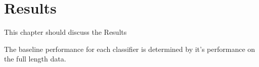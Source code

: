 \chapter{Results}
\label{ChapterResults}
This chapter should discuss the Results

The baseline performance for each classifier is determined by it's performance on the full length data.